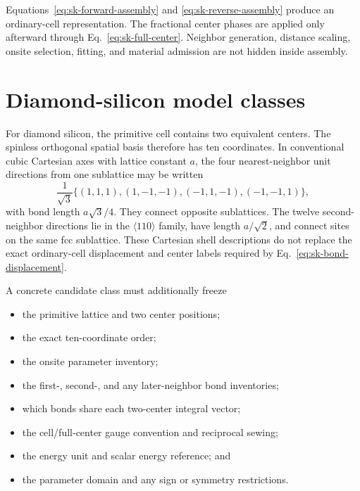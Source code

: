 Equations~\eqref{eq:sk-forward-assembly} and
\eqref{eq:sk-reverse-assembly} produce an ordinary-cell representation. The
fractional center phases are applied only afterward through
Eq.~\eqref{eq:sk-full-center}. Neighbor generation, distance scaling, onsite
selection, fitting, and material admission are not hidden inside assembly.

\section{Diamond-silicon model classes}

For diamond silicon, the primitive cell contains two equivalent centers. The
spinless orthogonal spatial basis therefore has ten coordinates. In conventional
cubic Cartesian axes with lattice constant $a$, the four nearest-neighbor unit
directions from one sublattice may be written
\begin{equation}
  \frac{1}{\sqrt3}
  \bigl
  \{
    (1,1,1),
    (1,-1,-1),
    (-1,1,-1),
    (-1,-1,1)
  \bigr\},
  \label{eq:diamond-nearest-directions}
\end{equation}
with bond length $a\sqrt3/4$. They connect opposite sublattices. The twelve
second-neighbor directions lie in the $\langle110\rangle$ family, have length
$a/\sqrt2$, and connect sites on the same fcc sublattice. These Cartesian shell
descriptions do not replace the exact ordinary-cell displacement and center
labels required by Eq.~\eqref{eq:sk-bond-displacement}.

A concrete candidate class must additionally freeze

\begin{itemize}
  \item the primitive lattice and two center positions;
  \item the exact ten-coordinate order;
  \item the onsite parameter inventory;
  \item the first-, second-, and any later-neighbor bond inventories;
  \item which bonds share each two-center integral vector;
  \item the cell/full-center gauge convention and reciprocal sewing;
  \item the energy unit and scalar energy reference; and
  \item the parameter domain and any sign or symmetry restrictions.
\end{itemize}

